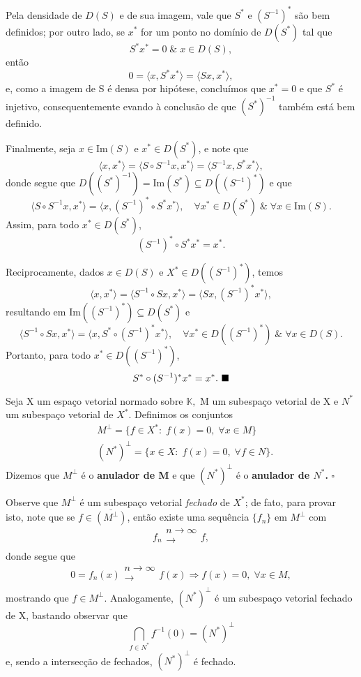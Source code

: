 \documentclass[../functional_analysis.tex]{subfiles}
\begin{document}
\begin{proof*}
	Pela densidade de \(D(S)\) e de sua imagem, vale que \(S^{*}\) e \((S^{-1})^{*}\) são bem definidos; por outro lado, se \(x^{*}\) for um ponto no domínio de \(D(S^{*})\) tal que
	\[
		S^{*}x^{*} = 0\;\& \; x\in D(S),
	\]
	então
	\[
		0 = \langle x, S^{*}x^{*} \rangle = \langle Sx, x^{*} \rangle,
	\]
	e, como a imagem de S é densa por hipótese, concluímos que \(x^{*} = 0\) e que \(S^{*}\) é injetivo, consequentemente evando à conclusão de que \((S^{*})^{-1}\) também está bem definido.

	Finalmente, seja \(x\in \mathrm{Im}(S)\) e \(x^{*}\in D(S^{*})\), e note que
	\[
		\langle x, x^{*} \rangle = \langle S\circ S^{-1}x, x^{*} \rangle = \langle S^{-1}x, S^{*}x^{*} \rangle,
	\]
	donde segue que \(D((S^{*})^{-1}) = \mathrm{Im}(S^{*}) \subseteq D((S^{-1})^{*})\) e que
	\[
		\langle S\circ S^{-1}x, x^{*} \rangle = \langle x, (S^{-1})^{*}\circ S^{*}x^{*} \rangle, \quad \forall x^{*}\in D(S^{*})\;\&\; \forall x\in \mathrm{Im}(S).
	\]
	Assim, para todo \(x^{*}\in D(S^{*})\),
	\[
		(S^{-1})^{*}\circ S^{*}x^{*} = x^{*}.
	\]

	Reciprocamente, dados \(x\in D(S)\) e \(X^{*}\in D((S^{-1})^{*})\), temos
	\[
		\langle x, x^{*} \rangle = \langle S^{-1}\circ Sx, x^{*} \rangle = \langle Sx, (S^{-1})^{*}x^{*} \rangle,
	\]
	resultando em \(\mathrm{Im}((S^{-1})^{*})\subseteq D(S^{*})\) e
	\[
		\langle S^{-1}\circ Sx, x^{*} \rangle = \langle x, S^{*}\circ (S^{-1})^{*}x^{*} \rangle, \quad \forall x^{*}\in D((S^{-1})^{*})\;\&\; \forall x\in D(S).
	\]
	Portanto, para todo \(x^{*}\in D((S^{-1})^{*})\),
	\[
		S^{*}\circ (S^{-1})^{*}x^{*} = x^{*}.\text{ $\blacksquare$} \]
\end{proof*}
\begin{def*}
	Seja X um espaço vetorial normado sobre \(\mathbb{K},\) M um subespaço vetorial de X e \(N^{*}\) um subespaço vetorial de \(X^{*}.\) Definimos os conjuntos
	\begin{align*}
		 & M^{\perp } = \{f\in X^{*}:\; f(x) = 0,\; \forall x\in M\}    \\
		 & (N^{*})^{\perp } = \{x\in X:\; f(x) = 0,\; \forall f\in N\}.
	\end{align*}
	Dizemos que \(M^{\perp }\) é o \textbf{anulador de M} e que \((N^{*})^{\perp }\) é o \textbf{anulador de \(N^{*}\).} \(\square\)
\end{def*}
Observe que \(M^{\perp }\) é um subespaço vetorial \textit{fechado} de \(X^{*}\); de fato, para provar isto, note que se \(f\in \overline{(M^{\perp })}\), então existe uma sequência \(\{f_{n}\}\) em \(M^{\perp }\) com
\[
	f_{n}\substack{n\to \infty \\ \longrightarrow \\ }f,
\]
donde segue que
\[
	0 = f_{n}(x)\substack{n\to \infty \\ \longrightarrow \\ }f(x) \Rightarrow f(x) = 0,\; \forall x\in M,
\]
mostrando que \(f\in M^{\perp }\). Analogamente, \((N^{*})^{\perp }\) é um subespaço vetorial fechado de X, bastando observar que
\[
	\bigcap_{f\in N^{*}}^{}f^{-1}(0) = (N^{*})^{\perp}
\]
e, sendo a intersecção de fechados, \((N^{*})^{\perp }\) é fechado.
\end{document}
